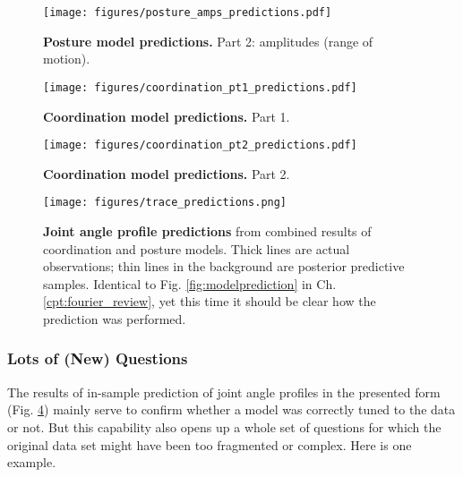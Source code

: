 \begin{figure}[h!]
\centering
\texttt{[image: figures/posture\_amps\_predictions.pdf]}
\caption{\label{fig:posture2}\textbf{Posture model predictions.} Part 2: amplitudes (range of motion).}
\end{figure}

\begin{figure}[h!]
\centering
\texttt{[image: figures/coordination\_pt1\_predictions.pdf]}
\caption{\label{fig:coordination1}\textbf{Coordination model predictions.} Part 1.}
\end{figure}

\begin{figure}[h!]
\centering
\texttt{[image: figures/coordination\_pt2\_predictions.pdf]}
\caption{\label{fig:coordination2}\textbf{Coordination model predictions.} Part 2.}
\end{figure}


\begin{figure}[h!]
\centering
\texttt{[image: figures/trace\_predictions.png]}
\caption{\label{fig:japprediction}\textbf{Joint angle profile predictions} from combined results of coordination and posture models. Thick lines are actual observations; thin lines in the background are posterior predictive samples. Identical to Fig. \ref{fig:modelprediction} in Ch. \ref{cpt:fourier_review}, yet this time it should be clear how the prediction was performed.}
\end{figure}


\FloatBarrier\clearpage
\subsubsection{Lots of (New) Questions}
\label{sec:orgc1e641b}
The results of in-sample prediction of joint angle profiles in the presented form (Fig. \ref{fig:japprediction}) mainly serve to confirm whether a model was correctly tuned to the data or not.
But this capability also opens up a whole set of questions for which the original data set might have been too fragmented or complex.
Here is one example.


